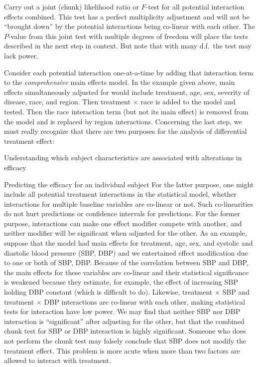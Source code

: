 \item Carry out a joint (chunk) likelihood ratio or $F$-test for all \ipacue potential interaction effects combined.  This test has a perfect multiplicity adjustment and will not be ``brought down'' by the potential interactions being co-linear with each other.  The $P$-value from this joint test with multiple degrees of freedom will place the tests described in the next step in context.  But note that with many d.f.\ the test may lack power.
\item Consider each potential interaction one-at-a-time by adding that interaction term to the \emph{comprehensive} main effects model.  In the example given above, main effects simultaneously adjusted for would include treatment, age, sex, severity of disease, race, and region.  Then treatment $\times$ race is added to the model and tested.  Then the race interaction term (but not its main effect) is removed from the model and is replaced by region interactions.
\ei
Concerning the last step, we must really recognize that there are two purposes for the analysis of differential treatment effect:
\be
\item Understanding which subject characteristics are associated with alterations in efficacy
\item Predicting the efficacy for an individual subject
\ee
For the latter purpose, one might include all potential treatment interactions in the statistical model, whether interactions for multiple baseline variables are co-linear or not.  Such co-linearities do not hurt predictions or confidence intervals for predictions.  For the former purpose, interactions can make one effect modifier compete with another, and neither modifier will be significant when adjusted for the other.  As an example, suppose that the model had main effects for treatment, age, sex, and systolic and diastolic blood pressure (SBP, DBP) and we entertained effect modification due to one or both of SBP, DBP.  Because of the correlation between SBP and DBP, the main effects for these variables are co-linear and their statistical significance is weakened because they estimate, for example, the effect of increasing SBP holding DBP constant (which is difficult to do).  Likewise, treatment $\times$ SBP and treatment $\times$ DBP interactions are co-linear with each other, making statistical tests for interaction have low power.  We may find that neither SBP nor DBP interaction is ``significant'' after adjusting for the other, but that the combined chunk test for SBP or DBP interaction is highly significant.  Someone who does not perform the chunk test may falsely conclude that SBP does not modify the treatment effect. This problem is more acute when more than two factors are allowed to interact with treatment.

